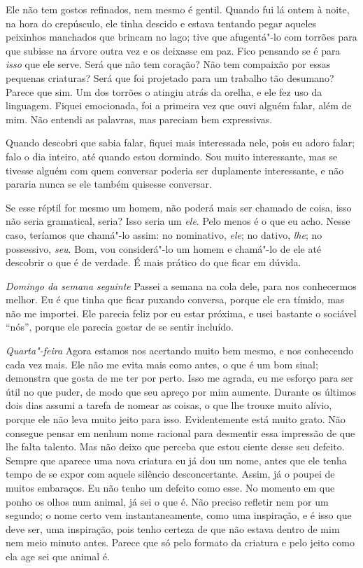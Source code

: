 Ele não tem gostos refinados, nem mesmo é gentil. Quando fui lá ontem à noite,
na hora do crepúsculo, ele tinha descido e estava tentando pegar aqueles
peixinhos manchados que brincam no lago; tive que afugentá"-lo com torrões para
que subisse na árvore outra vez e os deixasse em paz. Fico pensando se é para \textit{isso} que
ele serve. Será que não tem coração? Não tem compaixão por essas pequenas
criaturas? Será que foi projetado para um trabalho tão desumano? Parece que
sim. Um dos torrões o atingiu atrás da orelha, e ele fez uso da linguagem.
Fiquei emocionada, foi a primeira vez que ouvi alguém falar, além de mim.
Não entendi as palavras, mas pareciam bem expressivas.

Quando descobri que sabia falar, fiquei mais interessada nele, pois eu adoro
falar; falo o dia inteiro, até quando estou dormindo. Sou muito interessante,
mas se tivesse alguém com quem conversar poderia ser duplamente interessante,
e não pararia nunca se ele também quisesse conversar.

Se esse réptil for mesmo um homem, não poderá mais ser chamado de coisa,
isso não seria gramatical, seria? Isso seria um \textit{ele}. Pelo menos é o que eu acho.
Nesse caso, teríamos que chamá"-lo assim: no nominativo, \textit{ele}; no dativo, \textit{lhe}; no
possessivo, \textit{seu}. Bom, vou considerá"-lo um homem e chamá"-lo de ele até descobrir
o que é de verdade. É mais prático do que ficar em dúvida.

\textit{Domingo da semana seguinte} Passei a semana na cola dele, para nos conhecermos
melhor. Eu é que tinha que ficar puxando conversa, porque ele era tímido, mas não
me importei. Ele parecia feliz por eu estar próxima, e usei bastante o sociável
“nós”, porque ele parecia gostar de se sentir incluído.

\textit{Quarta"-feira} Agora estamos nos acertando muito bem mesmo, e nos conhecendo
cada vez mais. Ele não me evita mais como antes, o que é um bom sinal;
demonstra que gosta de me ter por perto. Isso me agrada, eu me esforço para
ser útil no que puder, de modo que seu apreço por mim aumente. Durante os últimos dois
dias assumi a tarefa de nomear as coisas, o que lhe trouxe muito
alívio, porque ele não leva muito jeito para isso. Evidentemente está muito
grato. Não consegue pensar em nenhum nome racional para desmentir essa
impressão de que lhe falta talento. Mas não deixo que perceba que estou ciente
desse seu defeito. Sempre que aparece uma nova criatura eu já dou um nome,
antes que ele tenha tempo de se expor com aquele silêncio desconcertante. Assim,
já o poupei de muitos embaraços. Eu não tenho um defeito como esse.
No momento em que ponho os olhos num animal, já sei o que é. Não preciso
refletir nem por um segundo; o nome certo vem instantaneamente, como
uma inspiração, e é isso que deve ser, uma inspiração, pois tenho certeza de que
não estava dentro de mim nem meio minuto antes. Parece que só pelo formato da
criatura e pelo jeito como ela age sei que animal é.

